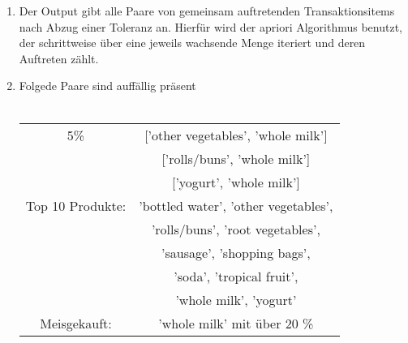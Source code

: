 \begin{enumerate}
	\item Der Output gibt alle Paare von gemeinsam auftretenden Transaktionsitems nach Abzug einer Toleranz an. 
	Hierfür wird der apriori Algorithmus benutzt, der schrittweise über eine jeweils wachsende Menge iteriert und deren Auftreten zählt.

	\item Folgede Paare sind auffällig präsent \\ \ \\
		\begin{tabular}{c|c}
		5\% 	& ['other vegetables', 'whole milk'] \\ 
			& ['rolls/buns', 'whole milk'] \\
			& ['yogurt', 'whole milk'] \\
		\hline
		Top 10 Produkte: & 'bottled water', 'other vegetables', \\
				 & 'rolls/buns', 'root vegetables', \\
				 & 'sausage', 'shopping bags', \\
				 & 'soda', 'tropical fruit', \\
				 & 'whole milk', 'yogurt' \\
		\hline
		Meisgekauft: & 'whole milk' mit über 20 \%

		
		\end{tabular}

\end{enumerate}
